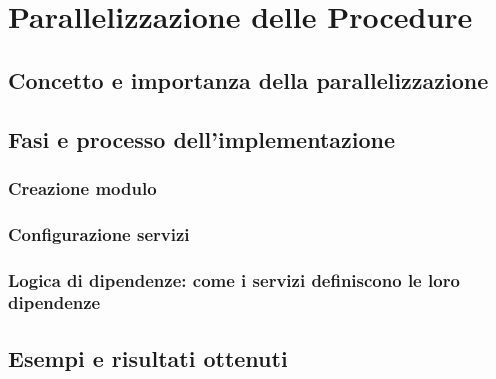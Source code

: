 \chapter{Parallelizzazione delle Procedure}
\label{cha:parallelizzazione}

\section{Concetto e importanza della parallelizzazione}
\label{sec:introduzione_parallelizzazione}

\section{Fasi e processo dell'implementazione}
\label{sec:fasi_parallelizzazione}

\subsection{Creazione modulo}
\label{sub:modulo_parallelizzazione}

\subsection{Configurazione servizi}
\label{sub:configurazione_parallelizzazione}

\subsection{Logica di dipendenze: come i servizi definiscono le loro dipendenze}
\label{sub:dipendenze}

\section{Esempi e risultati ottenuti}
\label{sec:esempi_risultati}